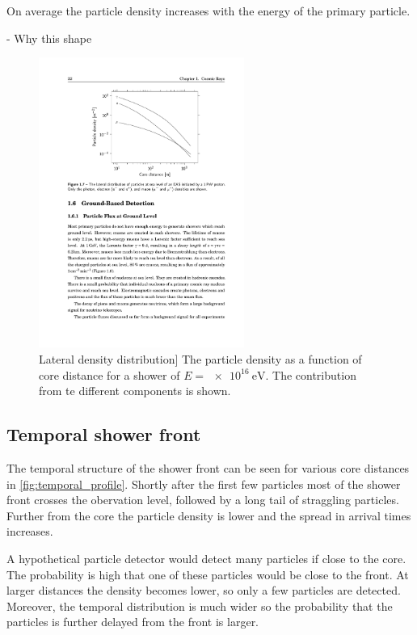 On average the particle density increases with the energy of the primary particle.

- Why this shape

\begin{figure}
    \centering
    \includegraphics[width=0.6\textwidth]
                    {plots/cosmic-rays/ldf}
    \caption{Lateral density distribution]
The particle density as a function of core distance for a shower of $E = \SI{e16}{\eV}$. The contribution from te different components is shown.}
    \label{fig:ldf}
\end{figure}


\subsection{Temporal shower front}

The temporal structure of the shower front can be seen for various core distances in \cref{fig:temporal_profile}. Shortly after the first few particles most of the shower front crosses the obervation level, followed by a long tail of straggling particles. Further from the core the particle density is lower and the spread in arrival times increases.

A hypothetical particle detector would detect many particles if close to the core. The probability is high that one of these particles would be close to the front. At larger distances the density becomes lower, so only a few particles are detected. Moreover, the temporal distribution is much wider so the probability that the particles is further delayed from the front is larger.

